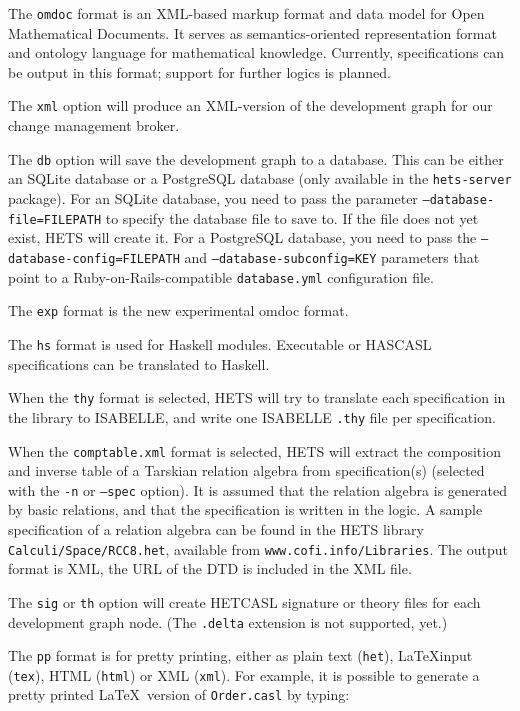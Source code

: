 \documentclass{article}
\newcommand{\normalTEXTSC}[2]{{#1\scriptsize#2}}
\newcommand     {\Hets}{\normalTEXTSC{H}{ETS}\xspace}
\newcommand     {\Isabelle}{\normalTEXTSC{I}{SABELLE}\xspace}
\newcommand     {\HasCASL}{\normalTEXTSC{H}{AS}\normalTEXTSC{C}{ASL}\xspace}
\newcommand{\HetCASL}{\normalTEXTSC{H}{ET}\normalTEXTSC{C}{ASL}\xspace}
\begin{document}
\begin{description}
The \texttt{omdoc} format \cite{books/sp/Kohlhase06} is an XML-based
markup format and data model for Open Mathematical Documents. It
serves as semantics-oriented representation format and ontology
language for mathematical knowledge. Currently, \CASL specifications
can be output in this format; support for further logics is planned.

The \texttt{xml} option will produce an XML-version of the development graph
for our change management broker.

The \texttt{db} option will save the development graph to a database.
This can be either an SQLite database or a PostgreSQL database (only available
in the \texttt{hets-server} package). For an SQLite database, you need to pass
the parameter \texttt{--database-file=FILEPATH} to specify the database file to
save to. If the file does not yet exist, \Hets will create it.
For a PostgreSQL database, you need to pass the
\texttt{--database-config=FILEPATH} and \texttt{--database-subconfig=KEY}
parameters that point to a Ruby-on-Rails-compatible \texttt{database.yml}
configuration file.

The \texttt{exp} format is the new experimental omdoc format.

The \texttt{hs} format is used for Haskell modules. Executable \CASL or
\HasCASL specifications can be translated to Haskell.

When the \texttt{thy} format is selected, \Hets will try to translate
each specification in the library to \Isabelle, and write one \Isabelle
\texttt{.thy} file per specification.

When the \texttt{comptable.xml} format is selected, \Hets will extract
the composition and inverse table of a Tarskian relation algebra from
specification(s) (selected with the \texttt{-n} or \texttt{--spec}
option). It is assumed that the relation algebra is
generated by basic relations, and that the specification is written
in the \CASL logic. A sample specification of a relation
algebra can be found in the \Hets library \texttt{Calculi/Space/RCC8.het},
available from \texttt{www.cofi.info/Libraries}.
The output format is XML, the URL of the DTD is included in the
XML file.

The \texttt{sig} or \texttt{th} option will create \HetCASL signature or
theory files for each development graph node. (The \texttt{.delta} extension
is not supported, yet.)

The \texttt{pp} format is for pretty printing, either as plain text
(\texttt{het}), \LaTeX input (\texttt{tex}), HTML (\texttt{html}) or XML
(\texttt{xml}).  For example, it is possible to generate a pretty printed
\LaTeX\ version of \texttt{Order.casl} by typing:


\end{description}
\end{document}
